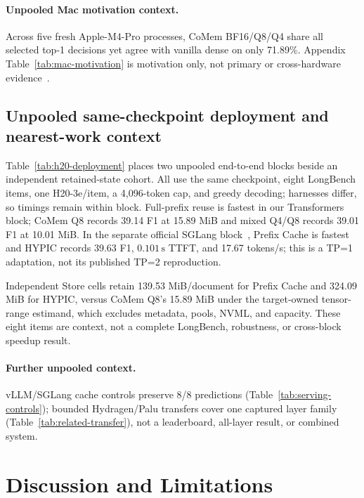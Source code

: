 \documentclass{article}
\begin{document}
\paragraph{Unpooled Mac motivation context.}

Across five fresh Apple-M4-Pro processes, CoMem BF16/Q8/Q4 share all selected
top-1 decisions yet agree with vanilla dense on only 71.89\%.  Appendix
Table~\ref{tab:mac-motivation} is motivation only, not primary or cross-hardware
evidence~\citep{liu2026comem,liu2026understanding}.

\FloatBarrier
\subsection{Unpooled same-checkpoint deployment and nearest-work context}

Table~\ref{tab:h20-deployment} places two unpooled end-to-end blocks beside an
independent retained-state cohort.  All use the same checkpoint, eight
LongBench items, one H20-3e/item, a 4,096-token cap, and greedy decoding;
harnesses differ, so timings remain within block.  Full-prefix reuse is fastest
in our Transformers block; CoMem Q8 records 39.14 F1 at 15.89 MiB and mixed
Q4/Q8 records 39.01 F1 at 10.01 MiB.  In the separate official SGLang
block~\citep{liu2026hypic}, Prefix Cache is fastest and HYPIC records 39.63 F1,
$0.101\,\mathrm{s}$ TTFT, and 17.67 tokens/s; this is a TP=1 adaptation, not its
published TP=2 reproduction.


\FloatBarrier

Independent Store cells retain 139.53 MiB/document for Prefix Cache and 324.09
MiB for HYPIC, versus CoMem Q8's 15.89 MiB under the target-owned tensor-range
estimand, which excludes metadata, pools, NVML, and capacity.  These eight
items are context, not a complete LongBench, robustness, or cross-block speedup
result.

\paragraph{Further unpooled context.}
vLLM/SGLang cache controls preserve 8/8 predictions
(Table~\ref{tab:serving-controls}); bounded Hydragen/Palu transfers cover one
captured layer family (Table~\ref{tab:related-transfer}), not a leaderboard,
all-layer result, or combined system.

\section{Discussion and Limitations}
\label{sec:limitations}
\end{document}
